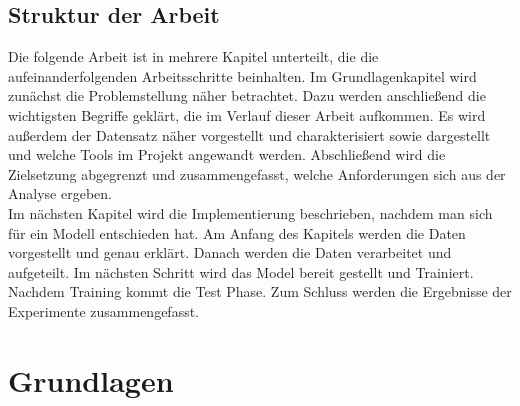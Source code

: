 \documentclass[a4paper,11pt]{article}
\theoremstyle{mytheor}
\begin{document}
\subsection{Struktur der Arbeit}
Die folgende Arbeit ist in mehrere Kapitel unterteilt, die die aufeinanderfolgenden Arbeitsschritte beinhalten. Im Grundlagenkapitel wird zunächst die Problemstellung näher betrachtet. Dazu werden anschließend die wichtigsten Begriffe geklärt, die im Verlauf dieser
Arbeit aufkommen. Es wird außerdem der Datensatz näher vorgestellt und charakterisiert sowie dargestellt und welche Tools im Projekt angewandt werden.
Abschließend wird die Zielsetzung abgegrenzt und zusammengefasst, welche Anforderungen sich aus der Analyse ergeben.\\
Im nächsten Kapitel wird die Implementierung beschrieben, nachdem man sich für ein Modell entschieden hat. Am Anfang des Kapitels werden die Daten vorgestellt und genau erklärt. Danach werden die Daten verarbeitet und aufgeteilt. Im nächsten Schritt wird das Model bereit gestellt und Trainiert. Nachdem Training kommt die Test Phase. Zum Schluss werden die Ergebnisse der Experimente zusammengefasst.
\newpage
\section{Grundlagen}
\end{document}
